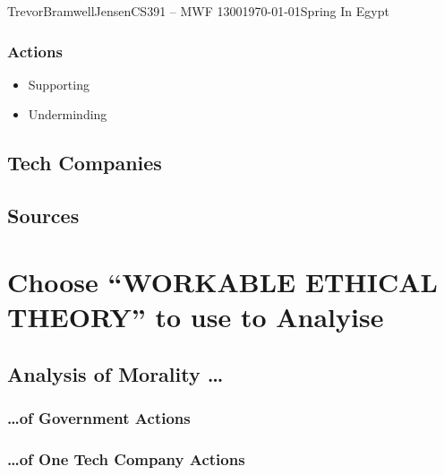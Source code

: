 \documentclass[12pt,letterpaper]{article}
\begin{document}
\begin{mla}{Trevor}{Bramwell}{Jensen}{CS391 -- MWF 1300}{\today}{Spring In Egypt}
        \subsubsection{Actions}
        \begin{itemize}
            \item Supporting
            \item Underminding
        \end{itemize}
    \subsection{Tech Companies}
    \subsection{Sources}

\section{Choose ``WORKABLE ETHICAL THEORY'' to use to Analyise}
    \subsection{Analysis of Morality \ldots}
        \subsubsection{\ldots of Government Actions}
        \subsubsection{\ldots of One Tech Company Actions}

\end{mla}
\end{document}
